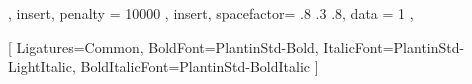 \usepackage[french, main=latin]{babel}
\usepackage[utf8]{inputenc}
\usepackage[urw-garamond]{mathdesign}
\usepackage[T1]{fontenc}
\usepackage{fontspec}
\usepackage{newunicodechar}
\usepackage{wrapfig}

{ {},         %
	{ insert, penalty = 10000 },                 %
	{ insert, spacefactor= .8 .3 .8, data = 1 }, %
	{}          %
}

\setmainfont{PlantinStd-Light}[
	Ligatures=Common,
	BoldFont=PlantinStd-Bold,
	ItalicFont=PlantinStd-LightItalic,
	BoldItalicFont=PlantinStd-BoldItalic
]

\newfontfamily{}
\newfontfamily{}
